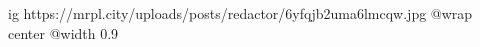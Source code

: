  
 
 
 
 

\ifcmt
  ig https://mrpl.city/uploads/posts/redactor/6yfqjb2uma6lmcqw.jpg
  @wrap center
  @width 0.9
\fi
